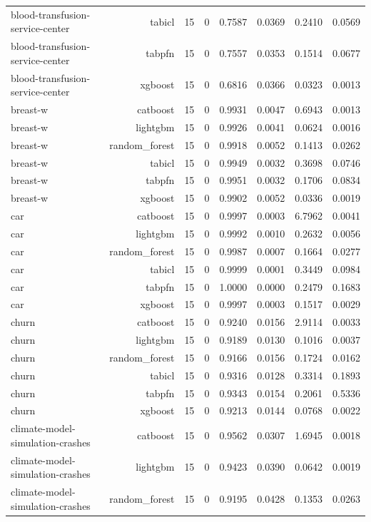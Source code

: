 \begin{table}[htbp]
\begin{tabular}{lrrrrrrr}
blood-transfusion-service-center & tabicl & 15 & 0 & 0.7587 & 0.0369 & 0.2410 & 0.0569 \\
blood-transfusion-service-center & tabpfn & 15 & 0 & 0.7557 & 0.0353 & 0.1514 & 0.0677 \\
blood-transfusion-service-center & xgboost & 15 & 0 & 0.6816 & 0.0366 & 0.0323 & 0.0013 \\
breast-w & catboost & 15 & 0 & 0.9931 & 0.0047 & 0.6943 & 0.0013 \\
breast-w & lightgbm & 15 & 0 & 0.9926 & 0.0041 & 0.0624 & 0.0016 \\
breast-w & random\_forest & 15 & 0 & 0.9918 & 0.0052 & 0.1413 & 0.0262 \\
breast-w & tabicl & 15 & 0 & 0.9949 & 0.0032 & 0.3698 & 0.0746 \\
breast-w & tabpfn & 15 & 0 & 0.9951 & 0.0032 & 0.1706 & 0.0834 \\
breast-w & xgboost & 15 & 0 & 0.9902 & 0.0052 & 0.0336 & 0.0019 \\
car & catboost & 15 & 0 & 0.9997 & 0.0003 & 6.7962 & 0.0041 \\
car & lightgbm & 15 & 0 & 0.9992 & 0.0010 & 0.2632 & 0.0056 \\
car & random\_forest & 15 & 0 & 0.9987 & 0.0007 & 0.1664 & 0.0277 \\
car & tabicl & 15 & 0 & 0.9999 & 0.0001 & 0.3449 & 0.0984 \\
car & tabpfn & 15 & 0 & 1.0000 & 0.0000 & 0.2479 & 0.1683 \\
car & xgboost & 15 & 0 & 0.9997 & 0.0003 & 0.1517 & 0.0029 \\
churn & catboost & 15 & 0 & 0.9240 & 0.0156 & 2.9114 & 0.0033 \\
churn & lightgbm & 15 & 0 & 0.9189 & 0.0130 & 0.1016 & 0.0037 \\
churn & random\_forest & 15 & 0 & 0.9166 & 0.0156 & 0.1724 & 0.0162 \\
churn & tabicl & 15 & 0 & 0.9316 & 0.0128 & 0.3314 & 0.1893 \\
churn & tabpfn & 15 & 0 & 0.9343 & 0.0154 & 0.2061 & 0.5336 \\
churn & xgboost & 15 & 0 & 0.9213 & 0.0144 & 0.0768 & 0.0022 \\
climate-model-simulation-crashes & catboost & 15 & 0 & 0.9562 & 0.0307 & 1.6945 & 0.0018 \\
climate-model-simulation-crashes & lightgbm & 15 & 0 & 0.9423 & 0.0390 & 0.0642 & 0.0019 \\
climate-model-simulation-crashes & random\_forest & 15 & 0 & 0.9195 & 0.0428 & 0.1353 & 0.0263 \\

\end{tabular}
\end{table}
